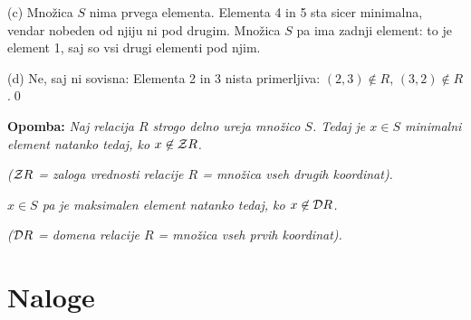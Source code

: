 \documentclass[11pt,paper=b5,footinclude,headinclude]{scrbook} %
\begin{document}
(c) Množica $S$ nima prvega elementa. Elementa 4 in 5 sta sicer minimalna, vendar nobeden
od njiju ni pod drugim. Množica $S$ pa ima zadnji element: to je element 1, saj so vsi drugi elementi
pod njim.

(d) Ne, saj ni sovisna: Elementa 2 in 3 nista primerljiva: $(2,3)\not\in R$, $(3,2)\not\in R$.\qed

\bigskip
\textbf{Opomba:} \emph{Naj relacija $R$ strogo delno ureja množico $S$.
Tedaj je $x\in S$ minimalni element natanko tedaj, ko $x\not\in {\cal Z}R$.}

\emph{(${\cal Z}R$ = zaloga vrednosti relacije $R$ = množica vseh drugih koordinat).}

\emph{$x\in S$ pa je maksimalen element natanko tedaj, ko $x\not\in {\cal D}R$.}

\emph{(${\cal D}R$ = domena relacije $R$ = množica vseh prvih koordinat).}


\section{Naloge}
\end{document}
